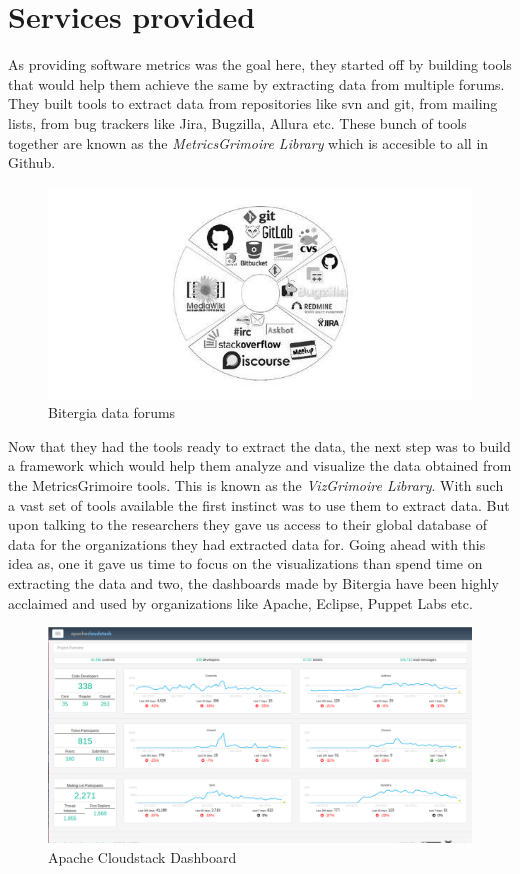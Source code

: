 \documentclass[seploa]{beavtex}
\begin{document}
\section{Services provided}
As providing software metrics was the goal here, they started off by building tools that would help them achieve the same by extracting data from multiple forums. They built tools to extract data from repositories like svn and git, from mailing lists, from bug trackers like Jira, Bugzilla, Allura etc. These bunch of tools together are known as the \emph{MetricsGrimoire Library} which is accesible to all in Github.

\begin{figure}[!ht]
\centering
\includegraphics[width=140mm]{bitergia.jpg}
\caption{Bitergia data forums}
\end{figure}

Now that they had the tools ready to extract the data, the next step was to build a framework which would help them analyze and visualize the data obtained from the MetricsGrimoire tools. This is known as the \emph{VizGrimoire Library}. With such a vast set of tools available the first instinct was to use them to extract data. But upon talking to the researchers they gave us access to their global database of data for the organizations they had extracted data for. Going ahead with this idea as, one it gave us time to focus on the visualizations than spend time on extracting the data and two, the dashboards made by Bitergia have been highly acclaimed and used by organizations like Apache, Eclipse, Puppet Labs etc.

\begin{figure}[H]
\centering
\includegraphics[width=120mm]{apache.png}
\caption{Apache Cloudstack Dashboard}
\end{figure}
\end{document}
